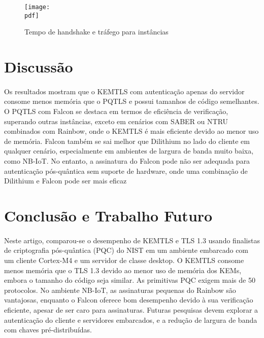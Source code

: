 \documentclass[letterpaper,11pt,leqno]{article}
\newcommand{\pdf}{figures/figures}
\begin{document}
\begin{figure}[H]
	{\texttt{[image: \\pdf]}}
	\caption{Tempo de handshake e tráfego para instâncias}
	\label{f:figure2}\end{figure}

\section{Discussão}

\paragraph{}
Os resultados mostram que o KEMTLS com autenticação apenas do servidor consome
menos memória que o PQTLS e possui tamanhos de código semelhantes. O PQTLS com
Falcon se destaca em termos de eficiência de verificação, superando outras
instâncias, exceto em cenários com SABER ou NTRU combinados com Rainbow, onde o
KEMTLS é mais eficiente devido ao menor uso de memória. Falcon também se sai
melhor que Dilithium no lado do cliente em qualquer cenário, especialmente em
ambientes de largura de banda muito baixa, como NB-IoT. No entanto, a assinatura
do Falcon pode não ser adequada para autenticação pós-quântica sem suporte de
hardware, onde uma combinação de Dilithium e Falcon pode ser mais eficaz

\section{Conclusão e Trabalho Futuro}

\paragraph{}
Neste artigo, comparou-se o desempenho de KEMTLS e TLS 1.3 usando finalistas de
criptografia pós-quântica (PQC) do NIST em um ambiente embarcado com um cliente
Cortex-M4 e um servidor de classe desktop. O KEMTLS consome menos memória que o
TLS 1.3 devido ao menor uso de memória dos KEMs, embora o tamanho do código seja
similar. As primitivas PQC exigem mais de 50%
protocolos. No ambiente NB-IoT, as assinaturas pequenas do Rainbow são
vantajosas, enquanto o Falcon oferece bom desempenho devido à sua verificação
eficiente, apesar de ser caro para assinaturas. Futuras pesquisas devem explorar
a autenticação do cliente e servidores embarcados, e a redução de largura de
banda com chaves pré-distribuídas.

% 
\end{document}
